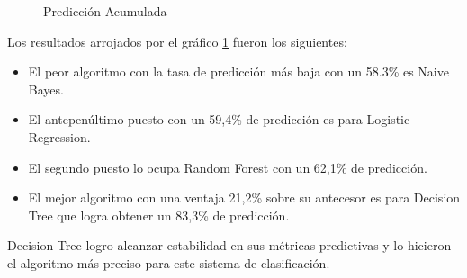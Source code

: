 \begin{center}
    	\begin{figure}[H]
	\centering
	\caption{Predicción Acumulada}
	\label{fig:pa}
	\end{figure}
\end{center}
    
    Los resultados arrojados por el gráfico \ref{fig:pa} fueron los siguientes:\\
\begin{itemize}
	\item El peor algoritmo con la tasa de predicción más baja con un 58.3\% es Naive Bayes.
	\item El antepenúltimo puesto con un
59,4\% de predicción es para Logistic Regression.
	\item El segundo puesto lo ocupa Random Forest con un 62,1\% de predicción.
	\item El mejor algoritmo con una ventaja 21,2\% sobre su
antecesor es para Decision Tree que logra obtener un 83,3\% de
predicción.
\end{itemize}   

Decision Tree logro alcanzar estabilidad en sus métricas predictivas y
lo hicieron el algoritmo más preciso para este sistema de clasificación.
